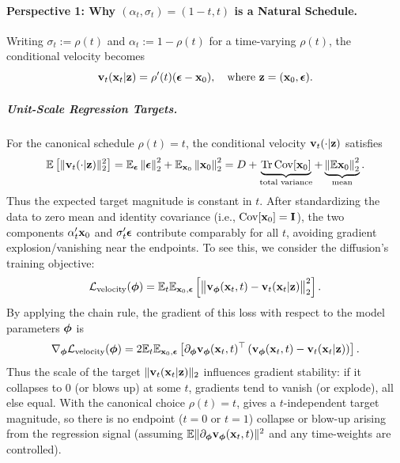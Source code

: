 \paragraph{Perspective 1: Why $(\alpha_t,\sigma_t)=(1-t,t)$ is a Natural Schedule.}
Writing $\sigma_t:=\rho(t)$ and $\alpha_t:=1-\rho(t)$ for a time-varying $\rho(t)$, the conditional velocity becomes
\[
{\mathbf{v}}_t({\mathbf{x}}_t |{\mathbf{z}})
=\rho'(t)({\bm{\epsilon}}-{\mathbf{x}}_0),
\quad\text{where } {\mathbf{z}}=({\mathbf{x}}_0,{\bm{\epsilon}}).
\]


\subparagraph{Unit-Scale Regression Targets.}
For the canonical schedule $\rho(t)=t$, the conditional velocity ${\mathbf{v}}_t(\cdot |{\mathbf{z}})$ satisfies
\begin{align}\label{eq:unit-velocity}
\mathbb{E}\left[\|{\mathbf{v}}_t(\cdot |{\mathbf{z}})\|_2^2\right]
=\mathbb{E}_{{\bm{\epsilon}}}\left\lVert{\bm{\epsilon}}\right\rVert_2^2+\mathbb{E}_{{\mathbf{x}}_0}\left\lVert{\mathbf{x}}_0\right\rVert^2_2 = D + \underbrace{\operatorname{Tr}\mathrm{Cov}[{\mathbf{x}}_0]}_{\text{total variance}}+\underbrace{\left\lVert\mathbb{E}{\mathbf{x}}_0\right\rVert^2_2}_{\text{mean}}.
\end{align}
Thus the expected target magnitude is constant in $t$. After standardizing the data to zero mean and identity covariance (i.e., $\mathrm{Cov}[{\mathbf{x}}_0]={\mathbf{I}}$), the two components
$\alpha_t'{\mathbf{x}}_0$ and $\sigma_t'{\bm{\epsilon}}$ contribute comparably for all $t$, avoiding gradient explosion/vanishing near the endpoints.
To see this, we consider the diffusion's training objective:
\[
\mathcal{L}_{\mathrm{velocity}}({\bm{\phi}})
= \mathbb{E}_{t}  \mathbb{E}_{{\mathbf{x}}_0,{\bm{\epsilon}}}\left[\big\|{\mathbf{v}}_{{\bm{\phi}}}({\mathbf{x}}_t,t) - {\mathbf{v}}_t({\mathbf{x}}_t|{\mathbf{z}})\big\|_2^2
\right].
\]
By applying the chain rule, the gradient of this loss with respect to the model parameters ${\bm{\phi}}$ is
\[
\nabla_{{\bm{\phi}}}\mathcal{L}_{\mathrm{velocity}}({\bm{\phi}})
= 2  \mathbb{E}_{t}  \mathbb{E}_{{\mathbf{x}}_0,{\bm{\epsilon}}} \left[
  \partial_{{\bm{\phi}}}{\mathbf{v}}_{{\bm{\phi}}}({\mathbf{x}}_t,t)^{\top} \left({\mathbf{v}}_{{\bm{\phi}}}({\mathbf{x}}_t,t) - {\mathbf{v}}_t({\mathbf{x}}_t|{\mathbf{z}})\right)
\right].
\]
Thus the scale of the target $\|{\mathbf{v}}_t({\mathbf{x}}_t|{\mathbf{z}})\|_2$ influences gradient stability:
if it collapses to $0$ (or blows up) at some $t$, gradients tend to vanish (or explode), 
all else equal. With the canonical choice $\rho(t)=t$, 
 gives a $t$-independent target magnitude, so there is no 
endpoint ($t=0$ or $t=1$) collapse or blow-up arising from the regression signal
(assuming $\mathbb{E}\|\partial_{{\bm{\phi}}}{\mathbf{v}}_{{\bm{\phi}}}({\mathbf{x}}_t,t)\|^2$ 
and any time-weights are controlled).


